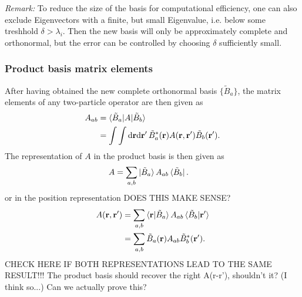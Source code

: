 \documentclass[12pt,a4paper]{scrartcl}
\numberwithin{equation}{section}
\newcommand{\cng}[1]{{\color{red}#1}}
\renewcommand{\vec}{\mathbf}
\begin{document}
\textit{Remark:}
To reduce the size of the basis for computational efficiency, one can also exclude Eigenvectors with a finite, 
but small Eigenvalue, i.e. below some treshhold $\delta > \lambda_i$.
Then the new basis will only be approximately complete and orthonormal, but the error can be controlled by choosing
$\delta$ sufficiently small.

\subsubsection{Product basis matrix elements}

After having obtained the new complete orthonormal basis $\{ \tilde{B}_a  \}$, the matrix elements
of any two-particle operator are then given as
\begin{align}
A_{ab}
&= \braket{ \tilde{B}_a | A | \tilde{B}_b } \\
&= \int \int \mathrm{d}\vec{r}\mathrm{d}\vec{r}' \,  \tilde{B}^*_a(\vec{r})  A(\vec{r},\vec{r}') \tilde{B}_b(\vec{r}').
\end{align}
The representation of $A$ in the product basis is then given as
\begin{align}
A &= \sum_{a,b} \ket{\tilde{B}_a}A_{ab}\bra{\tilde{B}_b} .
\end{align}
or in the position representation \cng{DOES THIS MAKE SENSE?}
\begin{align}
 A(\vec{r},\vec{r}') &= \sum_{a,b} \braket{\vec{r}|\tilde{B}_a} A_{ab}\braket{\tilde{B}_b|\vec{r}'} \\
 &= \sum_{a,b} \tilde{B}_a(\vec{r}) A_{ab}\tilde{B}^*_b(\vec{r}') .
\end{align}
\cng{CHECK HERE IF BOTH REPRESENTATIONS LEAD TO THE SAME RESULT!!! The product basis should recover
the right A(r-r'), shouldn't it? (I think so...) Can we actually prove this?}
\end{document}
